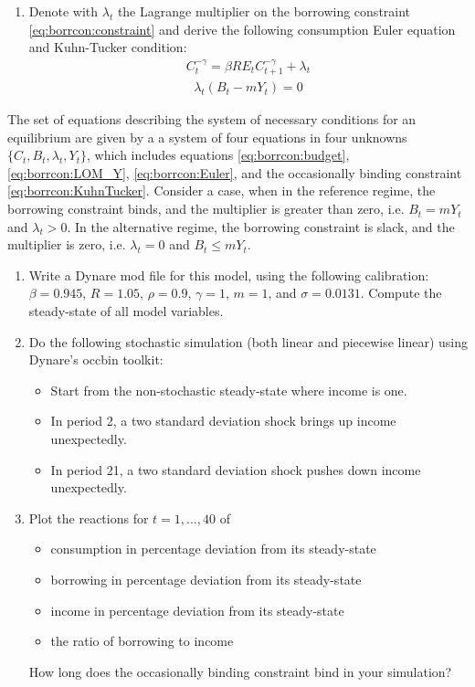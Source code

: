 \documentclass{article}
\begin{document}
\begin{enumerate}
\item Denote with $\lambda_t$ the Lagrange multiplier on the borrowing constraint \eqref{eq:borrcon:constraint} and
  derive the following consumption Euler equation and Kuhn-Tucker condition:
\begin{align}
C_t^{-\gamma} = \beta R E_t C_{t+1}^{-\gamma} + \lambda_t \label{eq:borrcon:Euler}
\end{align}
\begin{align}
\lambda_t (B_t - mY_t) = 0 \label{eq:borrcon:KuhnTucker}
\end{align}
\end{enumerate}
The set of equations describing the system of necessary conditions for an equilibrium are given by a
  a system of four equations in four unknowns $\{C_t,B_t,\lambda_t,Y_t\}$,
  which includes equations \eqref{eq:borrcon:budget}, \eqref{eq:borrcon:LOM_Y}, \eqref{eq:borrcon:Euler},
  and the occasionally binding constraint \eqref{eq:borrcon:KuhnTucker}.
Consider a case, when in the reference regime, the borrowing constraint binds,
  and the multiplier is greater than zero, i.e. $B_t=mY_t$ and $\lambda_t>0$.
In the alternative regime, the borrowing constraint is slack, and the multiplier is zero,
  i.e. $\lambda_t=0$ and $B_t\leq m Y_t$.
\begin{enumerate}[resume]
\item Write a Dynare mod file for this model, using the following calibration: $\beta=0.945$, $R=1.05$, $\rho=0.9$, $\gamma=1$, $m=1$, and $\sigma=0.0131$.
Compute the steady-state of all model variables.
\item Do the following stochastic simulation (both linear and piecewise linear) using Dynare's occbin toolkit:
\begin{itemize}
\item Start from the non-stochastic steady-state where income is one.
\item In period 2, a two standard deviation shock brings up income unexpectedly.
\item In period 21, a two standard deviation shock pushes down income unexpectedly.
\end{itemize}
\item Plot the reactions for $t=1,...,40$ of
\begin{itemize}
  \item consumption in percentage deviation from its steady-state
  \item borrowing in percentage deviation from its steady-state
  \item income in percentage deviation from its steady-state
  \item the ratio of borrowing to income  
\end{itemize}
How long does the occasionally binding constraint bind in your simulation?
\end{enumerate}
\newpage
\end{document}
